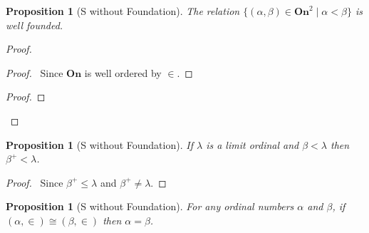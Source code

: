 \documentclass{book}
\let\qed\relax
\newtheorem{prop}[ax]{Proposition}
\theoremstyle{definition}
\begin{document}
\begin{prop}[S without Foundation]
The relation $\{ (\alpha, \beta) \in \mathbf{On}^2 \mid \alpha < \beta \}$ is well founded.
\end{prop}

\begin{proof}
\pf
{}
\begin{proof}
	\pf\ Since $\mathbf{On}$ is well ordered by $\in$.
\end{proof}
\begin{proof}
\end{proof}
\qed
\end{proof}

\begin{prop}[S without Foundation]
If $\lambda$ is a limit ordinal and $\beta < \lambda$ then $\beta^+ < \lambda$.
\end{prop}

\begin{proof}
\pf\ Since $\beta^+ \leq \lambda$ and $\beta^+ \neq \lambda$. \qed
\end{proof}

\begin{prop}[S without Foundation]
\label{prop:ordisoeq}
For any ordinal numbers $\alpha$ and $\beta$, if $(\alpha, \in) \cong (\beta, \in)$ then $\alpha = \beta$.
\end{prop}
\end{document}
